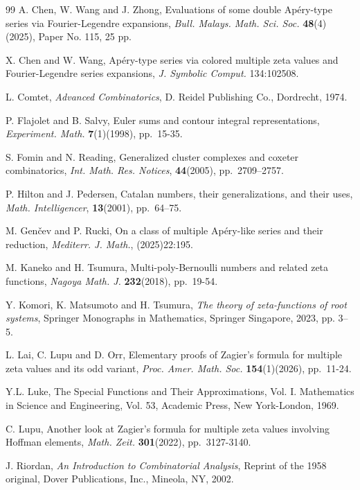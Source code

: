 \documentclass[11pt]{article}
\theoremstyle{plain}
\theoremstyle{definition}
\begin{document}
\begin{thebibliography}{99}
A. Chen, W. Wang and J. Zhong, Evaluations of some double Ap\'ery-type series via Fourier-Legendre expansions, \emph{Bull. Malays. Math. Sci. Soc.} \textbf{48}(4)(2025),  Paper No. 115, 25 pp.

X. Chen and W. Wang, Ap\'ery-type series via colored multiple zeta values and Fourier-Legendre series expansions, \emph{J. Symbolic Comput.} 134:102508.

L. Comtet, \emph{Advanced Combinatorics}, D. Reidel Publishing Co., Dordrecht, 1974.

P. Flajolet and B. Salvy, Euler sums and contour integral representations, \emph{Experiment. Math.} \textbf{7}(1)(1998), pp.\  15-35.

S. Fomin and N. Reading, Generalized cluster complexes and coxeter combinatorics, \emph{Int. Math. Res. Notices}, {\bf 44}(2005), pp.\ 2709--2757.

P. Hilton and J. Pedersen, Catalan numbers, their generalizations, and their uses, \emph{Math. Intelligencer}, {\bf 13}(2001), pp.\ 64--75.

M. Gen\v{c}ev and P. Rucki, On a class of multiple Ap\'ery-like series and their reduction, \emph{Mediterr. J. Math.}, (2025)22:195.

M. Kaneko and H. Tsumura, Multi-poly-Bernoulli numbers and related zeta functions, \emph{Nagoya Math. J.} {\bf 232}(2018), pp.\ 19-54.

 Y. Komori, K. Matsumoto and H. Tsumura, \textit{The theory of zeta-functions of root systems}, Springer Monographs in Mathematics, Springer Singapore, 2023, pp. 3--5.

L. Lai, C. Lupu and D. Orr, Elementary proofs of Zagier's formula for multiple zeta values and its odd variant, \emph{Proc. Amer. Math. Soc.} \textbf{154}(1)(2026), pp.\ 11-24.

Y.L. Luke,
The Special Functions and Their Approximations, Vol. I.
Mathematics in Science and Engineering, Vol. 53,
Academic Press, New York-London, 1969.

C. Lupu, Another look at Zagier's formula for multiple zeta values involving Hoffman elements, \emph{Math. Zeit.} \textbf{301}(2022), pp.\ 3127-3140.

J. Riordan, \emph{An Introduction to Combinatorial Analysis}, Reprint of the 1958 original, Dover Publications, Inc., Mineola, NY, 2002.


\end{thebibliography}
\end{document}
